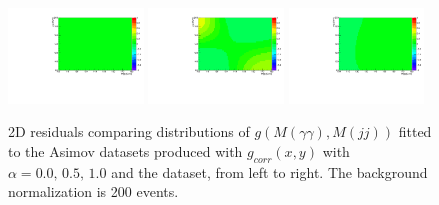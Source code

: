 \begin{figure}[h]
  \centering
\includegraphics[width=0.32\textwidth]{figures/sec-background/correlation/res_th2F_res_th2f_res_alpha_00_n200.pdf}
\includegraphics[width=0.32\textwidth]{figures/sec-background/correlation/res_th2F_res_th2f_res_alpha_05_n200.pdf}
\includegraphics[width=0.32\textwidth]{figures/sec-background/correlation/res_th2F_res_th2f_res_alpha_10_n200.pdf}
  \caption{2D residuals comparing distributions of $g(M(\gamma\gamma),M(jj))$ fitted to the Asimov datasets produced with $g_{corr}(x,y)$ with $\alpha = 0.0,\,0.5,\,1.0$ and the dataset, from left to right. The background normalization is 200 events.}
  \label{fig:res_norm200}
\end{figure}

